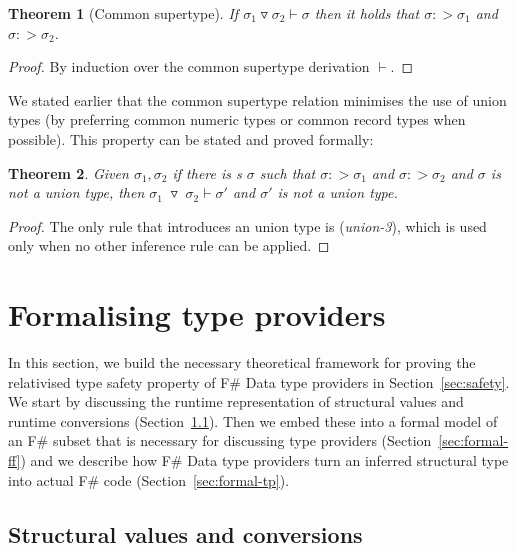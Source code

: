 \documentclass[preprint]{sigplanconf}
\newcommand{\tsep}[0]{\; \triangledown \;}
\newtheorem{theorem}{Theorem}
\begin{document}
\begin{theorem}[Common supertype]
\raggedright
If $\sigma_1 \triangledown \sigma_2 \vdash \sigma$ then it holds that $\sigma :> \sigma_1$ and $\sigma :> \sigma_2$.
\end{theorem}
\begin{proof}
By induction over the common supertype derivation $\vdash$.
\end{proof}

\noindent
We stated earlier that the common supertype relation minimises the use of union types 
(by preferring common numeric types or common record types when possible). This property
can be stated and proved formally:
%
\begin{theorem}
\label{thm:no-unions}
Given $\sigma_1, \sigma_2$ if there is s $\sigma$ such that $\sigma :> \sigma_1$ and 
$\sigma :> \sigma_2$ and $\sigma$ is not a union type, then $\sigma_1 \tsep \sigma_2 \vdash \sigma'$ 
and $\sigma'$ is not a union type.
\end{theorem}
\begin{proof}
The only rule that introduces an union type is (\emph{union-3}), which is used only when 
no other inference rule can be applied.
\end{proof}


\section{Formalising type providers}
\label{sec:formal}

In this section, we build the necessary theoretical framework for proving the relativised type safety 
property of F\# Data type providers in Section~\ref{sec:safety}. We start by discussing the runtime 
representation of structural values and runtime conversions (Section~\ref{sec:formal-convert}). Then 
we embed these into a formal model of an F\# subset that is necessary for discussing type providers 
(Section~\ref{sec:formal-ff}) and we describe how F\# Data type providers turn an inferred 
structural type into actual F\# code (Section~\ref{sec:formal-tp}).


\subsection{Structural values and conversions}
\label{sec:formal-convert}
\end{document}
